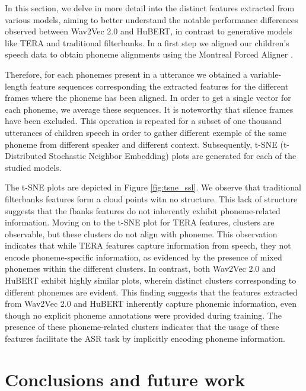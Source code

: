 In this section, we delve in more detail into the distinct features extracted from various models, aiming to better understand the notable performance differences observed between Wav2Vec 2.0 and HuBERT, in contrast to generative models like TERA and traditional filterbanks. In a first step we aligned our children's speech data to obtain phoneme alignments using the Montreal Forced Aligner \cite{mcauliffe2017montreal}. %

Therefore, for each phonemes present in a utterance we obtained a variable-length feature sequences corresponding the extracted features for the different frames where the phoneme has been aligned. In order to get a single vector for each phoneme, we average these sequences. It is noteworthy that silence frames have been excluded. This operation is repeated for a subset of one thousand utterances of children speech in order to gather different exemple of the same phoneme from different speaker and different context. Subsequently, t-SNE (t-Distributed Stochastic Neighbor Embedding) plots are generated for each of the studied models. 

The t-SNE plots are depicted in Figure \ref{fig:tsne_ssl}. We observe that traditional filterbanks features form a cloud points witn no structure. This lack of structure suggests that the fbanks features do not inherently exhibit phoneme-related information.
Moving on to the t-SNE plot for TERA features, clusters are observable, but these clusters do not align with phoneme. This observation indicates that while TERA features capture information from speech, they not encode phoneme-specific information, as evidenced by the presence of mixed phonemes within the different clusters.
In contrast, both Wav2Vec 2.0 and HuBERT exhibit highly similar plots, wherein distinct clusters corresponding to different phonemes are evident. This finding suggests that the features extracted from Wav2Vec 2.0 and HuBERT inherently capture phonemic information, even though no explicit phoneme annotations were provided during training. The presence of these phoneme-related clusters indicates that the usage of these features facilitate the ASR task by implicitly encoding phoneme information.



\section{Conclusions and future work}


